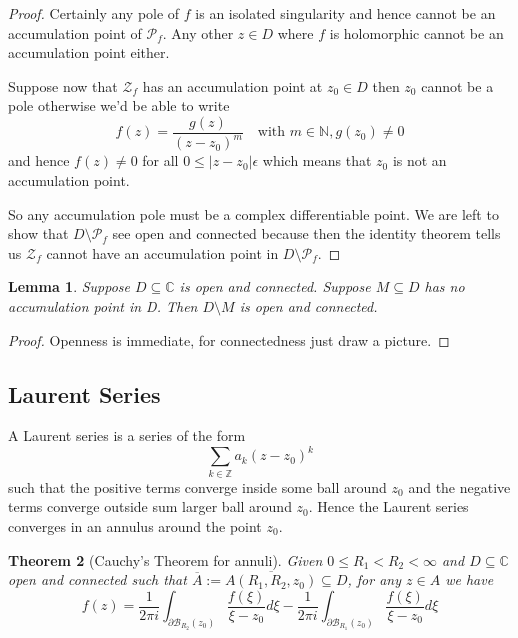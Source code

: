 \documentclass[11pt]{article}
\newcommand{\defeq}{:=}
\newcommand{\abs}[1]{|#1|}
\newcommand{\C}{\mathbb{C}}
\newcommand{\Z}{\mathbb{Z}}
\newcommand{\N}{\mathbb{N}}
\newenvironment{defin}
	{\begin{mdframed}[backgroundcolor=white, roundcorner=5pt, linewidth=1pt]}
	{\end{mdframed}}
\newcommand{\mdf}[1]{{\color{red} #1}}
\newtheorem{theorem}{Theorem}[section]
\newtheorem{lemma}[theorem]{Lemma}
\begin{document}
\begin{proof}
Certainly any pole of $f$ is an isolated singularity and hence cannot be an accumulation point of $\mathcal{P}_f$.
Any other $z\in D$ where $f$ is holomorphic cannot be an accumulation point either.

Suppose now that $\mathcal{Z}_f$ has an accumulation point at $z_0\in D$ then $z_0$ cannot be a pole otherwise we'd be able to write
\[
	f(z)=\frac{g(z)}{(z-z_0)^m}\quad\text{with }m\in\N, g(z_0)\neq 0
\]
and hence $f(z)\neq 0$ for all $0\leq\abs{z-z_0}\epsilon$ which means that $z_0$ is not an accumulation point.

So any accumulation pole must be a complex differentiable point.
We are left to show that $D\setminus\mathcal{P}_f$ see open and connected because then the identity theorem tells us $\mathcal{Z}_f$ cannot have an accumulation point in $D\setminus\mathcal{P}_f$.
\end{proof}

\begin{lemma}
Suppose $D\subseteq\C$ is open and connected.
Suppose $M\subseteq D$ has no accumulation point in D.
Then $D\setminus M$ is open and connected.
\end{lemma}

\begin{proof}
Openness is immediate, for connectedness just draw a picture.
\end{proof}

\subsection{Laurent Series}
\begin{defin}
	A \mdf{Laurent series} is a series of the form
	\[
		\sum_{k\in\Z}a_k(z-z_0)^k
	\]
	such that the positive terms converge inside some ball around $z_0$ and the negative terms converge outside sum larger ball around $z_0$.
	Hence the Laurent series converges in an annulus around the point $z_0$.
\end{defin}

\begin{theorem}[Cauchy's Theorem for annuli]
Given $0\leq R_1 < R_2 < \infty$ and $D\subseteq\C$ open and connected such that $\overline{A}\defeq\overline{A(R_1, R_2, z_0)}\subseteq D$, for any $z\in A$ we have
\[
	f(z) = \frac{1}{2\pi i}\int_{\partial \mathcal{B}_{R_2}(z_0)}\frac{f(\xi)}{\xi-z_0}d\xi - \frac{1}{2\pi i}\int_{\partial \mathcal{B}_{R_1}(z_0)}\frac{f(\xi)}{\xi-z_0}d\xi
\]
\end{theorem}
\end{document}
